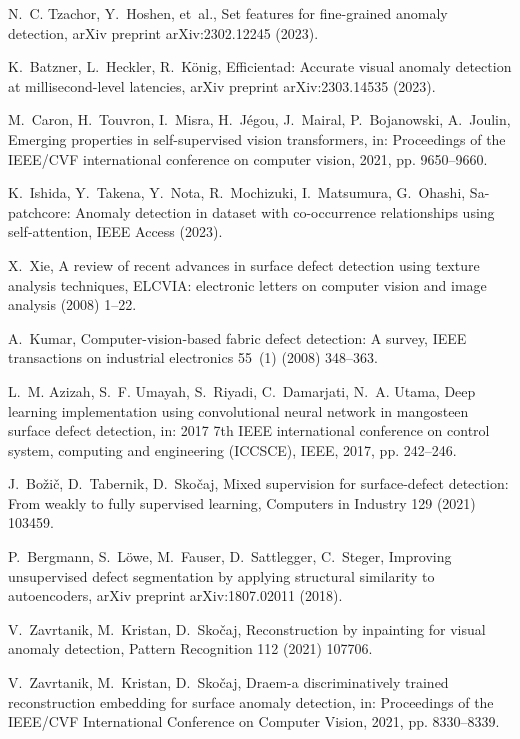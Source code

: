 \documentclass[final,5p,times,twocolumn]{elsarticle}
\begin{document}
\begin{thebibliography}{10}
N.~C. Tzachor, Y.~Hoshen, et~al., Set features for fine-grained anomaly
  detection, arXiv preprint arXiv:2302.12245 (2023).

K.~Batzner, L.~Heckler, R.~K{\"o}nig, Efficientad: Accurate visual anomaly
  detection at millisecond-level latencies, arXiv preprint arXiv:2303.14535
  (2023).

M.~Caron, H.~Touvron, I.~Misra, H.~J{\'e}gou, J.~Mairal, P.~Bojanowski,
  A.~Joulin, Emerging properties in self-supervised vision transformers, in:
  Proceedings of the IEEE/CVF international conference on computer vision,
  2021, pp. 9650--9660.

K.~Ishida, Y.~Takena, Y.~Nota, R.~Mochizuki, I.~Matsumura, G.~Ohashi,
  Sa-patchcore: Anomaly detection in dataset with co-occurrence relationships
  using self-attention, IEEE Access (2023).

X.~Xie, A review of recent advances in surface defect detection using texture
  analysis techniques, ELCVIA: electronic letters on computer vision and image
  analysis (2008) 1--22.

A.~Kumar, Computer-vision-based fabric defect detection: A survey, IEEE
  transactions on industrial electronics 55~(1) (2008) 348--363.

L.~M. Azizah, S.~F. Umayah, S.~Riyadi, C.~Damarjati, N.~A. Utama, Deep learning
  implementation using convolutional neural network in mangosteen surface
  defect detection, in: 2017 7th IEEE international conference on control
  system, computing and engineering (ICCSCE), IEEE, 2017, pp. 242--246.

J.~Bo{\v{z}}i{\v{c}}, D.~Tabernik, D.~Sko{\v{c}}aj, Mixed supervision for
  surface-defect detection: From weakly to fully supervised learning, Computers
  in Industry 129 (2021) 103459.

P.~Bergmann, S.~L{\"o}we, M.~Fauser, D.~Sattlegger, C.~Steger, Improving
  unsupervised defect segmentation by applying structural similarity to
  autoencoders, arXiv preprint arXiv:1807.02011 (2018).

V.~Zavrtanik, M.~Kristan, D.~Sko{\v{c}}aj, Reconstruction by inpainting for
  visual anomaly detection, Pattern Recognition 112 (2021) 107706.

V.~Zavrtanik, M.~Kristan, D.~Sko{\v{c}}aj, Draem-a discriminatively trained
  reconstruction embedding for surface anomaly detection, in: Proceedings of
  the IEEE/CVF International Conference on Computer Vision, 2021, pp.
  8330--8339.


\end{thebibliography}
\end{document}
